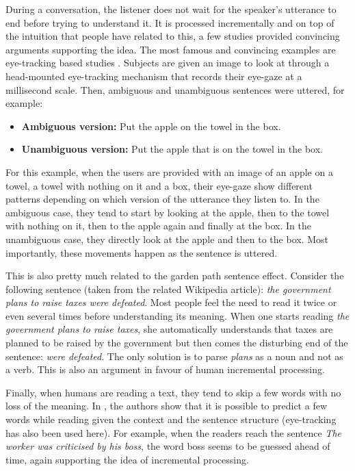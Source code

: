            During a conversation, the listener does not wait for the speaker's utterance to end before trying to understand it. It is processed incrementally and on top of the intuition that people have related to this, a few studies provided convincing arguments supporting the idea. The most famous and convincing examples are eye-tracking based studies \cite{Tanenhaus1995,Eberhard1995,Arnold2000}. Subjects are given an image to look at through a head-mounted eye-tracking mechanism that records their eye-gaze at a millisecond scale. Then, ambiguous and unambiguous sentences were uttered, for example:

           \begin{itemize}
             \item \textbf{Ambiguous version:} Put the apple on the towel in the box.
             \item \textbf{Unambiguous version:} Put the apple that is on the towel in the box.
           \end{itemize}

           For this example, when the users are provided with an image of an apple on a towel, a towel with nothing on it and a box, their eye-gaze show different patterns depending on which version of the utterance they listen to. In the ambiguous case, they tend to start by looking at the apple, then to the towel with nothing on it, then to the apple again and finally at the box. In the unambiguous case, they directly look at the apple and then to the box. Most importantly, these movements happen as the sentence is uttered.

           This is also pretty much related to the garden path sentence effect. Consider the following sentence (taken from the related Wikipedia article): \textit{the government plans to raise taxes were defeated}. Most people feel the need to read it twice or even several times before understanding its meaning. When one starts reading \textit{the government plans to raise taxes}, she automatically understands that taxes are planned to be raised by the government but then comes the disturbing end of the sentence: \textit{were defeated}. The only solution is to parse \textit{plans} as a noun and not as a verb. This is also an argument in favour of human incremental processing.

           Finally, when humans are reading a text, they tend to skip a few words with no loss of the meaning. In \cite{Ilkin2011}, the authors show that it is possible to predict a few words while reading given the context and the sentence structure (eye-tracking has also been used here). For example, when the readers reach the sentence \textit{The worker was criticised by his boss}, the word boss seems to be guessed ahead of time, again supporting the idea of incremental processing.


